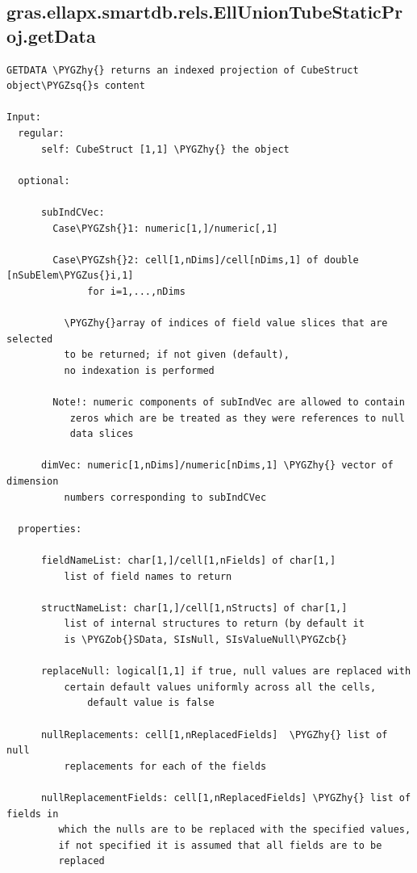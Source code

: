 \documentclass[letterpaper,10pt,english]{sphinxmanual}
\def\PYGZus{\char`\_}
\def\PYGZob{\char`\{}
\def\PYGZcb{\char`\}}
\def\PYGZsh{\char`\#}
\def\PYGZhy{\char`\-}
\def\PYGZsq{\char`\'}
\begin{document}
\subsection{gras.ellapx.smartdb.rels.EllUnionTubeStaticProj.getData}
\label{chap_functions:gras-ellapx-smartdb-rels-elluniontubestaticproj-getdata}
\begin{Verbatim}[commandchars=\\\{\}]
GETDATA \PYGZhy{} returns an indexed projection of CubeStruct object\PYGZsq{}s content

Input:
  regular:
      self: CubeStruct [1,1] \PYGZhy{} the object

  optional:

      subIndCVec:
        Case\PYGZsh{}1: numeric[1,]/numeric[,1]

        Case\PYGZsh{}2: cell[1,nDims]/cell[nDims,1] of double [nSubElem\PYGZus{}i,1]
              for i=1,...,nDims

          \PYGZhy{}array of indices of field value slices that are selected
          to be returned; if not given (default),
          no indexation is performed

        Note!: numeric components of subIndVec are allowed to contain
           zeros which are be treated as they were references to null
           data slices

      dimVec: numeric[1,nDims]/numeric[nDims,1] \PYGZhy{} vector of dimension
          numbers corresponding to subIndCVec

  properties:

      fieldNameList: char[1,]/cell[1,nFields] of char[1,]
          list of field names to return

      structNameList: char[1,]/cell[1,nStructs] of char[1,]
          list of internal structures to return (by default it
          is \PYGZob{}SData, SIsNull, SIsValueNull\PYGZcb{}

      replaceNull: logical[1,1] if true, null values are replaced with
          certain default values uniformly across all the cells,
              default value is false

      nullReplacements: cell[1,nReplacedFields]  \PYGZhy{} list of null
          replacements for each of the fields

      nullReplacementFields: cell[1,nReplacedFields] \PYGZhy{} list of fields in
         which the nulls are to be replaced with the specified values,
         if not specified it is assumed that all fields are to be
         replaced


\end{Verbatim}
\end{document}
